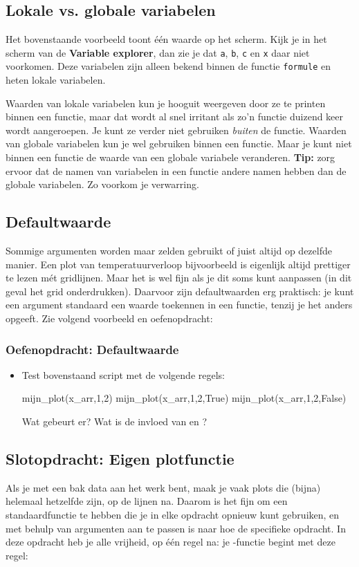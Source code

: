 \documentclass[a4paper,11pt, fleqn]{article}
\begin{document}
\subsection{Lokale vs. globale variabelen}
Het bovenstaande voorbeeld toont \'e\'en waarde op het scherm. Kijk je in het scherm van de \textbf{Variable explorer}, dan zie je dat \verb.a., \verb.b., \verb.c. en \verb.x. daar niet voorkomen. Deze variabelen zijn alleen bekend binnen de functie \verb.formule. en heten lokale variabelen. 

Waarden van lokale variabelen kun je hooguit weergeven door ze te printen binnen een functie, maar dat wordt al snel irritant als zo'n functie duizend keer wordt aangeroepen. Je kunt ze verder niet gebruiken {\it buiten} de functie. Waarden van globale variabelen kun je wel gebruiken binnen een functie. Maar je kunt niet binnen een functie de waarde van een globale variabele veranderen. {\bf Tip:} zorg ervoor dat de namen van variabelen in een functie andere namen hebben dan de globale variabelen. Zo voorkom je verwarring.

\subsection{Defaultwaarde}
Sommige argumenten worden maar zelden gebruikt of juist altijd op dezelfde manier. Een plot van temperatuurverloop bijvoorbeeld is eigenlijk altijd prettiger te lezen m\'et gridlijnen. Maar het is wel fijn als je dit soms kunt aanpassen (in dit geval het grid onderdrukken). Daarvoor zijn defaultwaarden erg praktisch: je kunt een argument standaard een waarde toekennen in een functie, tenzij je het anders opgeeft. Zie volgend voorbeeld en oefenopdracht:


\subsubsection*{Oefenopdracht: Defaultwaarde}
\begin{itemize}
	\item Test bovenstaand script met de volgende regels:
	\begin{python}
mijn_plot(x_arr,1,2)
mijn_plot(x_arr,1,2,True)
mijn_plot(x_arr,1,2,False)
	\end{python}
	Wat gebeurt er? Wat is de invloed van  en ?
\end{itemize}

\subsection{Slotopdracht: Eigen plotfunctie}
Als je met een bak data aan het werk bent, maak je vaak plots die (bijna) helemaal hetzelfde zijn, op de lijnen na. Daarom is het fijn om een standaardfunctie te hebben die je in elke opdracht opnieuw kunt gebruiken, en met behulp van argumenten aan te passen is naar hoe de specifieke opdracht. In deze opdracht heb je alle vrijheid, op \'e\'en regel na: je -functie begint met deze regel:
\end{document}
